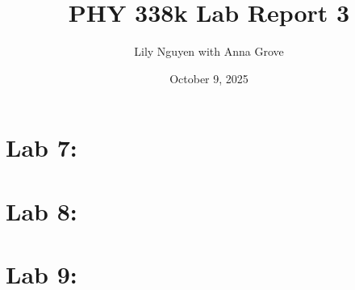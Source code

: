 \documentclass{article}
\title{PHY 338k Lab Report 3}
\author{Lily Nguyen with Anna Grove}
\date{October 9, 2025}
\begin{document}
\maketitle

\section{Lab 7: }

\section{Lab 8:}

\section{Lab 9:}
\end{document}
